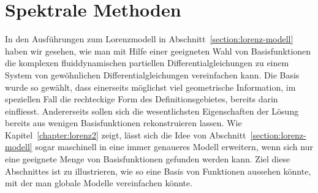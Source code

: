 %
%
%
\section{Spektrale Methoden}
In den Ausführungen zum Lorenzmodell in Abschnitt~\ref{section:lorenz-modell}
haben wir gesehen, wie man mit Hilfe einer geeigneten Wahl von Basisfunktionen
die komplexen fluiddynamischen partiellen Differentialgleichungen zu einem
System von gewöhnlichen Differentialgleichungen vereinfachen kann.
Die Basis wurde so gewählt, dass einerseits möglichst viel geometrische
Information, im speziellen Fall die rechteckige Form des Definitionsgebietes,
bereits darin einfliesst.
Andererseits sollen sich die wesentlichsten Eigenschaften der Lösung bereits
aus wenigen Basisfunktionen rekonstruieren lassen.
Wie Kapitel~\ref{chapter:lorenz2} zeigt, lässt sich die Idee von
Abschnitt~\ref{section:lorenz-modell} sogar maschinell in eine
immer genaueres Modell erweitern, wenn sich nur eine geeignete Menge
von Basisfunktionen gefunden werden kann.
Ziel diese Abschnittes ist zu illustrieren, wie so eine Basis von
Funktionen aussehen könnte, mit der man globale Modelle vereinfachen
könnte.






